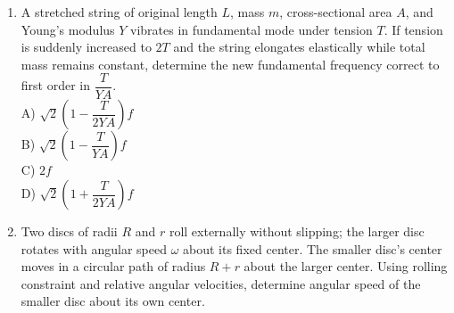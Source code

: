 \documentclass[12pt]{article}
\begin{document}
\begin{enumerate}
\begin{center}
\begin{tikzpicture}[scale=1]
\end{tikzpicture}
\end{center}

A) \(\dfrac{\pi\rho\omega^4R^6}{12g}\)\\

B) \(\dfrac{\pi\rho\omega^4R^6}{24g}\)\\

C) \(\dfrac{\pi\rho\omega^2R^4}{4}\)\\

D) Zero

\item A stretched string of original length \(L\), mass \(m\), cross-sectional area \(A\), and Young’s modulus \(Y\) vibrates in fundamental mode under tension \(T\). If tension is suddenly increased to \(2T\) and the string elongates elastically while total mass remains constant, determine the new fundamental frequency correct to first order in \(\dfrac{T}{YA}\).\\

A) \(\sqrt{2}\left(1-\dfrac{T}{2YA}\right)f\)\\

B) \(\sqrt{2}\left(1-\dfrac{T}{YA}\right)f\)\\

C) \(2f\)\\

D) \(\sqrt{2}\left(1+\dfrac{T}{2YA}\right)f\)

\item Two discs of radii \(R\) and \(r\) roll externally without slipping; the larger disc rotates with angular speed \(\omega\) about its fixed center. The smaller disc’s center moves in a circular path of radius \(R+r\) about the larger center. Using rolling constraint and relative angular velocities, determine angular speed of the smaller disc about its own center.\\

\begin{center}
\end{center}
\end{enumerate}
\end{document}
